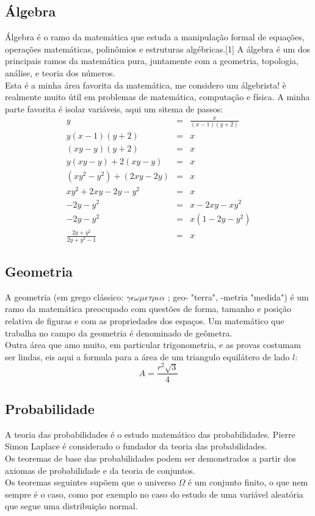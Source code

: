 \documentclass{article}
\begin{document}
    \subsection{Álgebra}
    Álgebra é o ramo da matemática que estuda a manipulação formal de equações, operações matemáticas, polinômios e estruturas algébricas.[1] A álgebra é um dos principais ramos da matemática pura, juntamente com a geometria, topologia, análise, e teoria dos números.\cite{algebra}
    \\Esta é a minha área favorita da matemática, me considero um álgebrista! è realmente muito útil em problemas de matemática, computação e física. A minha parte favorita é isolar variáveis, aqui um sitema de passos:
    \[
        \begin{array}{rcl}
            y&=&\frac{x}{(x-1)(y+2)}\\
            y(x-1)(y+2)&=&x\\
            (xy-y)(y+2)&=&x\\
            y(xy-y)+2(xy-y)&=&x\\
            (xy^2-y^2)+(2xy-2y)&=&x\\
            xy^2+2xy-2y-y^2&=&x\\
            -2y-y^2&=&x-2xy-xy^2\\
            -2y-y^2&=&x(1-2y-y^2)\\
            \frac{2y+y^2}{2y+y^2-1}&=&x
        \end{array}
    \]
    \subsection{Geometria}
    A geometria (em grego clássico: $ \gamma \epsilon \omega \mu \epsilon \tau \rho \iota \alpha $ ; geo- "terra", -metria "medida") é um ramo da matemática preocupado com questões de forma, tamanho e posição relativa de figuras e com as propriedades dos espaços. Um matemático que trabalha no campo da geometria é denominado de geômetra.\cite{geometria}
    \\Outra área que amo muito, em particular trigonometria, e as provas costumam ser lindas, eis aqui a formula para a área de um triangulo equilátero de lado $l$:
    \[
        A=\frac{r^2\sqrt{3}}{4}
    \]
    \subsection{Probabilidade}
    A teoria das probabilidades é o estudo matemático das probabilidades. Pierre Simon Laplace é considerado o fundador da teoria das probabilidades.
    \\Os teoremas de base das probabilidades podem ser demonstrados a partir dos axiomas de probabilidade e da teoria de conjuntos.
    \\Os teoremas seguintes supõem que o universo $\Omega$ é um conjunto finito, o que nem sempre é o caso, como por exemplo no caso do estudo de uma variável aleatória que segue uma distribuição normal.
\end{document}
